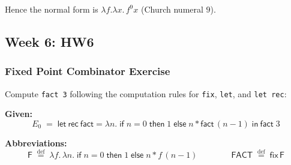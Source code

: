 \documentclass{article}
\theoremstyle{theorem}
\theoremstyle{definition}
\theoremstyle{remark}
\begin{document}
Hence the normal form is $\lambda f.\lambda x.\,f^{9}x$ (Church numeral $9$).

\subsection{Week 6: HW6}

\subsubsection{Fixed Point Combinator Exercise}

Compute \texttt{fact 3} following the computation rules for \texttt{fix}, \texttt{let}, and \texttt{let rec}:

\textbf{Given:}
\[
E_0 \;=\; \mathsf{let\ rec\ fact} = \lambda n.\; \mathsf{if}\;n=0\;\mathsf{then}\;1\;\mathsf{else}\;n * \mathsf{fact}\,(n-1)\;\mathsf{in\ fact}\;3
\]

\textbf{Abbreviations:}
\[
\mathsf{F} \;\overset{\mathrm{def}}{=}\; \lambda f.\,\lambda n.\; \mathsf{if}\;n=0\;\mathsf{then}\;1\;\mathsf{else}\;n * f\,(n-1)
\qquad\qquad
\mathsf{FACT} \;\overset{\mathrm{def}}{=}\; \mathsf{fix}\,\mathsf{F}
\]
\end{document}
